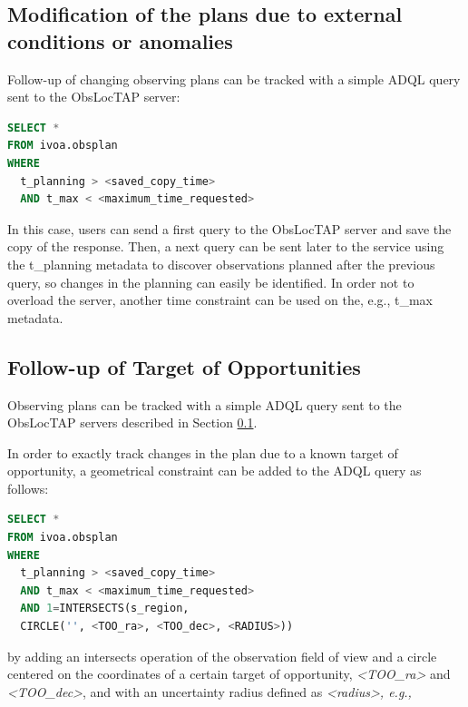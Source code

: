 \documentclass[11pt,a4paper]{ivoa}
\begin{document}
\subsection{Modification of the plans due to external conditions or anomalies}
\label{sec:UseCaseModPlans}
Follow-up of changing observing plans can be tracked with a simple ADQL query
sent to the ObsLocTAP server:


\begin{lstlisting}[language=SQL]
SELECT * 
FROM ivoa.obsplan
WHERE
  t_planning > <saved_copy_time>
  AND t_max < <maximum_time_requested>
\end{lstlisting}
In this case, users can send a first query to the ObsLocTAP server and save the
copy of the response. Then, a next query can be sent later to the service using
the t\_planning metadata to discover observations planned after the previous
query, so changes in the planning can easily be identified. In order not to
overload the server, another time constraint can be used on the, e.g., t\_max
metadata.
\par

\subsection{Follow-up of Target of Opportunities}
Observing plans can be tracked with a simple ADQL query sent to the ObsLocTAP
servers described in Section \ref{sec:UseCaseModPlans}.
\par

In order to exactly track changes in the plan due to a known target of
opportunity, a geometrical constraint can be added to the ADQL query as follows:

\begin{lstlisting}[language=SQL]
SELECT *
FROM ivoa.obsplan
WHERE
  t_planning > <saved_copy_time>
  AND t_max < <maximum_time_requested>
  AND 1=INTERSECTS(s_region, 
  CIRCLE('', <TOO_ra>, <TOO_dec>, <RADIUS>))
\end{lstlisting}

by adding an intersects operation of the observation field of view and a circle
centered on the coordinates of a certain target of opportunity,
\textit{<TOO\_ra>} and \textit{<TOO\_dec>}, and with an uncertainty
radius defined as \textit{<radius>, e.g.,}
\end{document}
